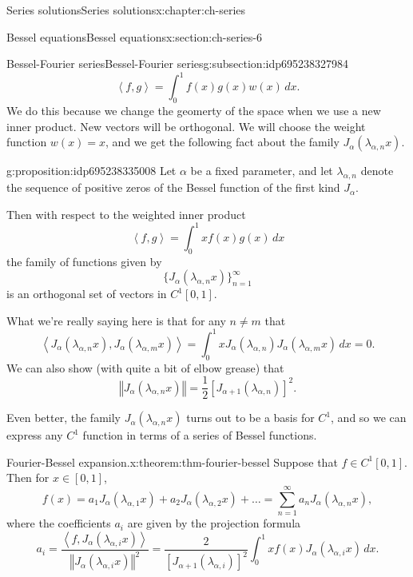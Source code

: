 \documentclass[oneside,10pt,]{book}
\numberwithin{equation}{section}
\newcommand{\norm}[1]{\left\Vert#1\right\Vert}
\newcommand{\ip}[2]{\left\langle #1, #2 \right\rangle}
\newcommand\la{\lambda}
\numberwithin{equation}{section}
\begin{document}
\begin{chapterptx}{Series solutions}{}{Series solutions}{}{}{x:chapter:ch-series}
\begin{sectionptx}{Bessel equations}{}{Bessel equations}{}{}{x:section:ch-series-6}
\begin{subsectionptx}{Bessel-Fourier series}{}{Bessel-Fourier series}{}{}{g:subsection:idp695238327984}
\begin{equation*}
\ip{f}{g} = \int_0^1 f(x)g(x)w(x)\, dx.
\end{equation*}
We do this because we change the geomerty of the space when we use a new inner product. New vectors will be orthogonal. We will choose the weight function \(w(x) = x\), and we get the following fact about the family \(J_\alpha(\la_{\alpha,n}x)\).%
\begin{proposition}{}{}{g:proposition:idp695238335008}%
Let \(\alpha\) be a fixed parameter, and let \(\la_{\alpha, n}\) denote the sequence of positive zeros of the Bessel function of the first kind \(J_\alpha\).%
\par
Then with respect to the weighted inner product%
\begin{equation*}
\ip{f}{g} = \int_0^1 xf(x)g(x)\, dx
\end{equation*}
the family of functions given by%
\begin{equation*}
\{J_\alpha(\la_{\alpha,n} x)\}_{n=1}^\infty
\end{equation*}
is an orthogonal set of vectors in \(C^1[0,1]\).%
\end{proposition}
What we're really saying here is that for any \(n\neq m\) that%
\begin{equation*}
\ip{J_\alpha(\la_{\alpha,n}x)}{J_\alpha(\la_{\alpha,m}x)} = \int_0^1 x J_\alpha(\la_{\alpha,n}) J_\alpha(\la_{\alpha,m}x) \, dx = 0.
\end{equation*}
We can also show (with quite a bit of elbow grease) that%
\begin{equation*}
\norm{J_\alpha(\la_{\alpha,n}x)} = \frac{1}{2} \left[ J_{\alpha + 1}(\la_{\alpha,n})\right]^2.
\end{equation*}
%
\par
Even better, the family \(J_\alpha(\la_{\alpha,n}x)\) turns out to be a basis for \(C^1\), and so we can express any \(C^1\) function in terms of a series of Bessel functions.%
\begin{theorem}{Fourier-Bessel expansion.}{}{x:theorem:thm-fourier-bessel}%
Suppose that \(f \in C^1[0,1]\). Then for \(x \in [0,1]\),%
\begin{equation*}
f(x) = a_1 J_\alpha(\la_{\alpha,1}x) + a_2 J_\alpha(\la_{\alpha,2}x) + \ldots = \sum_{n = 1}^\infty a_n J_\alpha (\la_{\alpha, n} x),
\end{equation*}
where the coefficients \(a_i\) are given by the projection formula%
\begin{equation*}
a_i = \frac{\ip{f}{J_{\alpha}(\la_{\alpha,i}x)}}{\norm{J_{\alpha}(\la_{\alpha,i}x)}^2} = \frac{2}{\left[ J_{\alpha + 1}(\la_{\alpha,i})\right]^2} \int_0^1 x f(x) J_\alpha(\la_{\alpha, i}x)\, dx.

\end{equation*}
\end{theorem}
\end{subsectionptx}
\end{sectionptx}
\end{chapterptx}
\end{document}
